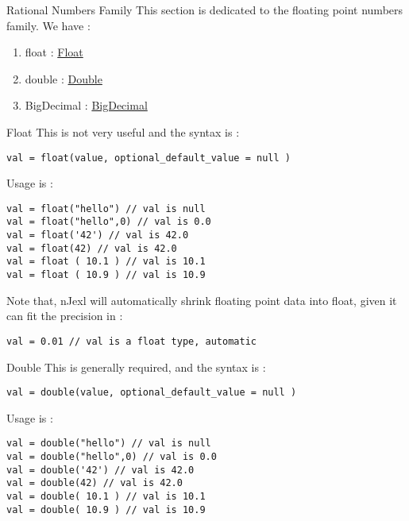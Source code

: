 \begin{section}{Rational Numbers Family}
This section is dedicated to the floating point numbers family.
We have :
\begin{enumerate}
\item{float : \href{https://docs.oracle.com/javase/8/docs/api/java/lang/Float.html}{Float} }
\item{double : \href{https://docs.oracle.com/javase/8/docs/api/java/lang/Double.html}{Double}}
\item{BigDecimal : \href{https://docs.oracle.com/javase/8/docs/api/java/math/BigDecimal.html}{BigDecimal} }
\end{enumerate}

\begin{subsection}{Float}
This is not very useful and the syntax is :

\begin{lstlisting}[style=JexlStyle]
val = float(value, optional_default_value = null )
\end{lstlisting}

Usage is :

\begin{lstlisting}[style=JexlStyle]
val = float("hello") // val is null
val = float("hello",0) // val is 0.0
val = float('42') // val is 42.0 
val = float(42) // val is 42.0 
val = float ( 10.1 ) // val is 10.1 
val = float ( 10.9 ) // val is 10.9 
\end{lstlisting}
Note that, nJexl will automatically shrink floating point data into float, 
given it can fit the precision in :

\begin{lstlisting}[style=JexlStyle]
val = 0.01 // val is a float type, automatic
\end{lstlisting}


\end{subsection}


\begin{subsection}{Double}
This is generally required, and the syntax is :

\begin{lstlisting}[style=JexlStyle]
val = double(value, optional_default_value = null )
\end{lstlisting}

Usage is :

\begin{lstlisting}[style=JexlStyle]
val = double("hello") // val is null
val = double("hello",0) // val is 0.0
val = double('42') // val is 42.0 
val = double(42) // val is 42.0 
val = double( 10.1 ) // val is 10.1 
val = double( 10.9 ) // val is 10.9 
\end{lstlisting}


\end{subsection}
\end{section}
